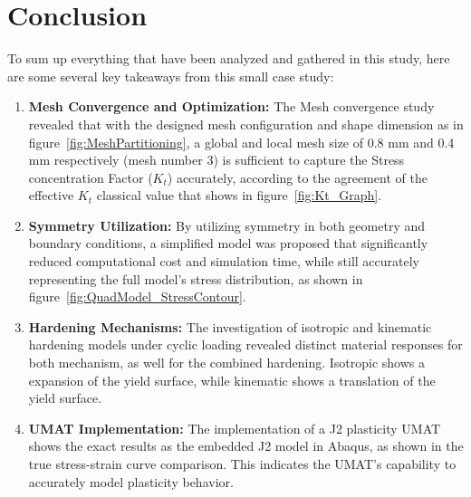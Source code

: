 \documentclass[12pt]{article}
\begin{document}
\section*{Conclusion}
To sum up everything that have been analyzed and gathered in this study, 
here are some several key takeaways from this small case study:
\begin{enumerate}
    \item \textbf{Mesh Convergence and Optimization:} The Mesh
    convergence study revealed that with the designed mesh configuration
    and shape dimension as in figure~\ref{fig:MeshPartitioning}, a global and local
    mesh size of 0.8 mm and 0.4 mm respectively (mesh number 3) is sufficient to capture the Stress
    concentration Factor ($K_t$) accurately, according to the agreement of the effective $K_t$
    classical value that shows in figure~\ref{fig:Kt_Graph}. 
    \item \textbf{Symmetry Utilization:} By utilizing symmetry in both geometry and boundary conditions,
    a simplified model was proposed that significantly reduced computational 
    cost and simulation time, while still accurately representing the full model's stress distribution, as shown in figure~\ref{fig:QuadModel_StressContour}.
    \item \textbf{Hardening Mechanisms:} The investigation of 
    isotropic and kinematic hardening models under cyclic loading revealed 
    distinct material responses for both mechanism, as well for the combined hardening. Isotropic shows a expansion
    of the yield surface, while kinematic shows a translation of the yield surface.
    \item \textbf{UMAT Implementation:} The implementation of a J2 plasticity 
    UMAT shows the exact results as the embedded J2 model in Abaqus, as shown in the true stress-strain curve
    comparison. This indicates the UMAT's capability to accurately model 
    plasticity behavior.
\end{enumerate}
\end{document}

